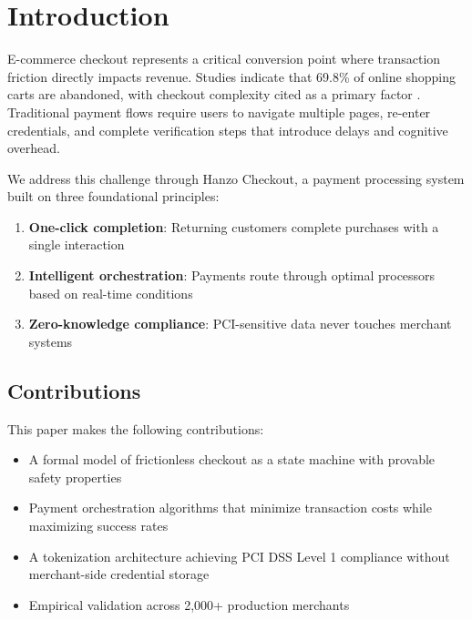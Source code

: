 \section{Introduction}


E-commerce checkout represents a critical conversion point where transaction friction directly impacts revenue. Studies indicate that 69.8\% of online shopping carts are abandoned, with checkout complexity cited as a primary factor \cite{baymard2018}. Traditional payment flows require users to navigate multiple pages, re-enter credentials, and complete verification steps that introduce delays and cognitive overhead.

We address this challenge through Hanzo Checkout, a payment processing system built on three foundational principles:

\begin{enumerate}
    \item \textbf{One-click completion}: Returning customers complete purchases with a single interaction
    \item \textbf{Intelligent orchestration}: Payments route through optimal processors based on real-time conditions
    \item \textbf{Zero-knowledge compliance}: PCI-sensitive data never touches merchant systems
\end{enumerate}

\subsection{Contributions}

This paper makes the following contributions:

\begin{itemize}
    \item A formal model of frictionless checkout as a state machine with provable safety properties
    \item Payment orchestration algorithms that minimize transaction costs while maximizing success rates
    \item A tokenization architecture achieving PCI DSS Level 1 compliance without merchant-side credential storage
    \item Empirical validation across 2,000+ production merchants
\end{itemize}

